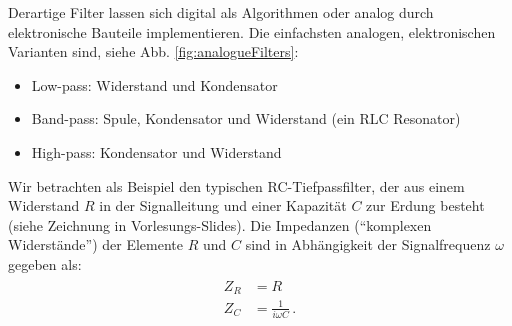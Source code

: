 
Derartige Filter lassen sich digital als Algorithmen oder analog durch elektronische Bauteile implementieren. Die einfachsten analogen, elektronischen Varianten sind, siehe Abb. \ref{fig:analogueFilters}:
\begin{itemize}
\setlength\itemsep{0em}
    \item Low-pass: Widerstand und Kondensator
    \item Band-pass: Spule, Kondensator und Widerstand (ein RLC Resonator)
    \item High-pass: Kondensator und Widerstand
\end{itemize}

Wir betrachten als Beispiel den typischen RC-Tiefpassfilter, der aus einem Widerstand $R$ in der Signalleitung und einer Kapazität $C$ zur Erdung besteht (siehe Zeichnung in Vorlesungs-Slides). Die Impedanzen (``komplexen Widerst\"ande'') der Elemente $R$ und $C$ sind in Abh\"angigkeit der Signalfrequenz $\omega$ gegeben als:
\begin{align}
    \begin{split}
        Z_R &= R\\
        Z_C &= \frac{1}{i \omega C}\,.
        \label{eq:vl10-4}
    \end{split}
\end{align}


